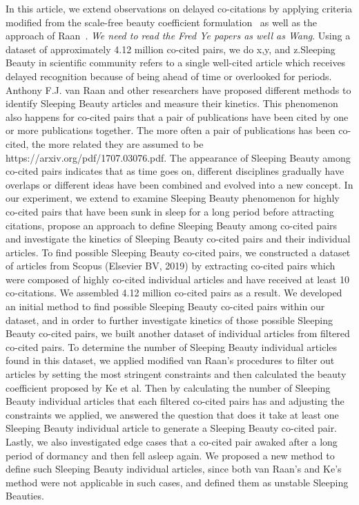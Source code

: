 \documentclass[utf8]{frontiersSCNS}
\begin{document}
{In this article, we extend observations on delayed co-citations by applying criteria modified from the scale-free beauty coefficient formulation~\citep{Ke2015} as well as the approach of Raan~\citep{Raan2004,Raan2019}. \emph{We need to read the Fred Ye papers as well as Wang}. Using a dataset of approximately 4.12 million co-cited pairs, we do x,y, and z.}{Sleeping Beauty in scientific community refers to a single well-cited article which receives delayed recognition because of being ahead of time or overlooked for periods. Anthony F.J. van Raan and other researchers have proposed different methods to identify Sleeping Beauty articles and measure their kinetics. This phenomenon also happens for co-cited pairs that a pair of publications have been cited by one or more publications together. The more often a pair of publications has been co-cited, the more related they are assumed to be https://arxiv.org/pdf/1707.03076.pdf. The appearance of Sleeping Beauty among co-cited pairs indicates that as time goes on, different disciplines gradually have overlaps or different ideas have been combined and evolved into a new concept. In our experiment, we extend to examine Sleeping Beauty phenomenon for highly co-cited pairs that have been sunk in sleep for a long period before attracting citations, propose an approach to define Sleeping Beauty among co-cited pairs and investigate the kinetics of Sleeping Beauty co-cited pairs and their individual articles. To find possible Sleeping Beauty co-cited pairs, we constructed a dataset of articles from Scopus (Elsevier BV, 2019) by extracting co-cited pairs which were composed of highly co-cited individual articles and have received at least 10 co-citations. We assembled 4.12 million co-cited pairs as a result. We developed an initial method to find possible Sleeping Beauty co-cited pairs within our dataset, and in order to further investigate kinetics of those possible Sleeping Beauty co-cited pairs, we built another dataset of individual articles from filtered co-cited pairs. To determine the number of Sleeping Beauty individual articles found in this dataset, we applied modified van Raan's procedures to filter out articles by setting the most stringent constraints and then calculated the beauty coefficient proposed by Ke et al. Then by calculating the number of Sleeping Beauty individual articles that each filtered co-cited pairs has and adjusting the constraints we applied, we answered the question that does it take at least one Sleeping Beauty individual article to generate a Sleeping Beauty co-cited pair. Lastly, we also investigated edge cases that a co-cited pair awaked after a long period of dormancy and then fell asleep again. We proposed a new method to define such Sleeping Beauty individual articles, since both van Raan's and Ke's method were not applicable in such cases, and defined them as unstable Sleeping Beauties.}
\end{document}
